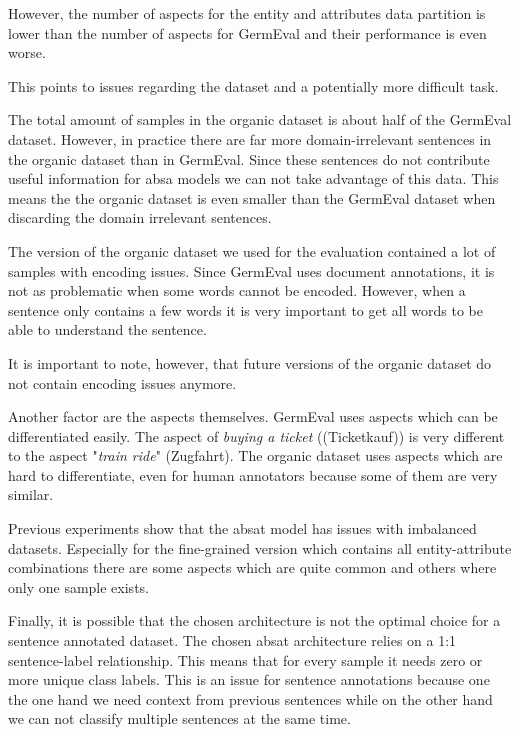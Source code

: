 However, the number of aspects for the entity and attributes data partition is lower than the number of aspects for GermEval and their performance is even worse.

This points to issues regarding the dataset and a potentially more difficult task. 
\medskip

The total amount of samples in the organic dataset is about half of the GermEval dataset. However, in practice there are far more domain-irrelevant sentences in the organic dataset than in GermEval. Since these sentences do not contribute useful information for \gls{absa} models we can not take advantage of this data. This means the the organic dataset is even smaller than the GermEval dataset when discarding the domain irrelevant sentences.
\medskip

The version of the organic dataset we used for the evaluation contained a lot of samples with encoding issues. Since GermEval uses document annotations, it is not as problematic when some words cannot be encoded. However, when a sentence only contains a few words it is very important to get all words to be able to understand the sentence. 

It is important to note, however, that future versions of the organic dataset do not contain encoding issues anymore.
\medskip

Another factor are the aspects themselves. GermEval uses aspects which can be differentiated easily. The aspect of \textit{buying a ticket} {((Ticketkauf))} is very different to the aspect "\textit{train ride}" {(Zugfahrt)}. The organic dataset uses aspects which are hard to differentiate, even for human annotators because some of them are very similar.
\medskip

Previous experiments show that the \gls{absat} model has issues with imbalanced datasets. Especially for the fine-grained version which contains all entity-attribute combinations there are some aspects which are quite common and others where only one sample exists.
\medskip

Finally, it is possible that the chosen architecture is not the optimal choice for a sentence annotated dataset. The chosen \gls{absat} architecture relies on a 1:1 sentence-label relationship. This means that for every sample it needs zero or more unique class labels. This is an issue for sentence annotations because one the one hand we need context from previous sentences while on the other hand we can not classify multiple sentences at the same time.
\smallskip

